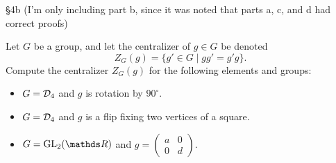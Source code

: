 \documentclass{homework}
\begin{document}
\begin{problem}{\S 4b}
  (I'm only including part b, since it was noted that parts a, c, and d had correct proofs) 

  Let $G$ be a group, and let the centralizer of $g\in G$ be denoted  \[
    Z_G(g) = \{g'\in G\mid gg'=g'g \} 
  .\] 
  Compute the centralizer $Z_G(g)$ for the following elements and groups:
  \begin{itemize}
    \item $G=\mathcal{D}_4$ and $g$ is rotation by $90^{\circ}$.
    \item $G=\mathcal{D}_4$ and $g$ is a flip fixing two vertices of a square.
    \item $G=\GL_2(\R)$ and $g=\begin{pmatrix} a&0\\0&d \end{pmatrix} $.
  \end{itemize}
\end{problem}
\end{document}
